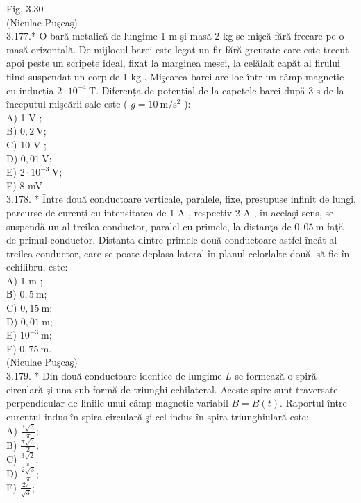 \documentclass[10pt]{article}
\begin{document}
Fig. 3.30\\
(Niculae Puşcaş)\\
3.177.* O bară metalică de lungime 1 m şi masă 2 kg se mişcă fără frecare pe o masă orizontală. De mijlocul barei este legat un fir fără greutate care este trecut apoi peste un scripete ideal, fixat la marginea mesei, la celălalt capăt al firului fiind suspendat un corp de 1 kg . Mişcarea barei are loc într-un câmp magnetic cu inducția $2 \cdot 10^{-4} \mathrm{~T}$. Diferența de potențial de la capetele barei după 3 s de la începutul mişcării sale este ( $g=10 \mathrm{~m} / \mathrm{s}^{2}$ ):\\
A) 1 V ;\\
B) $0,2 \mathrm{~V}$;\\
C) 10 V ;\\
D) $0,01 \mathrm{~V}$;\\
E) $2 \cdot 10^{-3} \mathrm{~V}$;\\
F) 8 mV .\\
3.178. * Între două conductoare verticale, paralele, fixe, presupuse infinit de lungi, parcurse de curenți cu intensitatea de 1 A , respectiv 2 A , în acelaşi sens, se suspendă un al treilea conductor, paralel cu primele, la distanţa de $0,05 \mathrm{~m}$ faţă de primul conductor. Distanța dintre primele două conductoare astfel încât al treilea conductor, care se poate deplasa lateral în planul celorlalte două, să fie în echilibru, este:\\
A) 1 m ;\\
В) $0,5 \mathrm{~m}$;\\
C) $0,15 \mathrm{~m}$;\\
D) $0,01 \mathrm{~m}$;\\
E) $10^{-3} \mathrm{~m}$;\\
F) $0,75 \mathrm{~m}$.\\
(Niculae Puşcaş)\\
3.179. * Din două conductoare identice de lungime $L$ se formează o spiră circulară şi una sub formă de triunghi echilateral. Aceste spire sunt traversate perpendicular de liniile unui câmp magnetic variabil $B=B(t)$. Raportul între curentul indus în spira circulară şi cel indus în spira triunghiulară este:\\
A) $\frac{3 \sqrt{3}}{\pi}$;\\
B) $\frac{\pi \sqrt{3}}{2}$;\\
C) $\frac{3 \sqrt{2}}{\pi}$;\\
D) $\frac{2 \sqrt{3}}{\pi}$;\\
E) $\frac{2 \pi}{\sqrt{3}}$;\\
\end{document}
